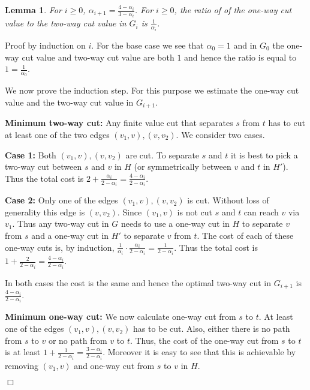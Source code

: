 \documentclass[11pt]{article}
\newtheorem{lemma}{Lemma}[section]
\renewenvironment{proof}{\vspace{-0.1in}\noindent{\bf Proof:}}{\hspace*{\fill}$\Box$\par}
\begin{document}
\begin{lemma}
  For $i \ge 0$, $\alpha_{i+1} = \frac{4 - \alpha_i}{3 - \alpha_i}$. 
  For $i \ge 0$, the ratio of of
  the one-way cut value to the two-way cut value in $G_{i}$ is
  $\frac{1}{\alpha_{i}}$.
\end{lemma}
\begin{proof}
  Proof by induction on $i$. For the base case we see that $\alpha_0 =
  1$ and in $G_0$ the one-way cut value and two-way cut value are both
  $1$ and hence the ratio is equal to $1 = \frac{1}{\alpha_0}$.
  
  We now prove the induction step. For this purpose we estimate the
  one-way cut value and the two-way cut value in $G_{i+1}$.

  \noindent
  \textbf{Minimum two-way cut:} Any finite value cut that separates
  $s$ from $t$ has to cut at least one of the two edges $(v_1,v), (v,v_2)$.
  We consider two cases.
  
  \noindent\textbf{Case 1:} Both $(v_1,v), (v,v_2)$ are cut. 
  To separate $s$ and $t$ it is best to pick a two-way cut between $s$
  and $v$ in $H$ (or symmetrically between $v$ and $t$ in $H'$).
  Thus the total cost is $2 + \frac{\alpha_i}{2-\alpha_i} = \frac{4 -
    \alpha_i}{2-\alpha_i}$.
  
  \noindent\textbf{Case 2:} Only one of the edges  $(v_1,v), (v,v_2)$ is cut.
  Without loss of generality this edge is $(v,v_2)$. Since $(v_1,v)$
  is not cut $s$ and $t$ can reach $v$ via $v_1$. Thus any two-way cut
  in $G$ needs to use a one-way cut in $H$ to separate $v$ from $s$
  and a one-way cut in $H'$ to separate $v$ from $t$. The cost of each
  of these one-way cuts is, by induction, $\frac{1}{\alpha_i} \cdot
  \frac{\alpha_i}{2-\alpha_i} = \frac{1}{2-\alpha_i}$. Thus the total
  cost is $1 + \frac{2}{2-\alpha_i} = \frac{4 -
    \alpha_i}{2-\alpha_i}$.

  In both cases the cost is the same and hence the optimal two-way cut in
  $G_{i+1}$ is $\frac{4 - \alpha_i}{2-\alpha_i}$.
  
 
  \noindent\textbf{Minimum one-way cut:} We now calculate one-way cut
  from $s$ to $t$. At least one of the edges $(v_1,v), (v,v_2)$ has to
  be cut. Also, either there is no path from $s$ to $v$ or no path from $v$ to
  $t$. Thus, the cost of the one-way cut from $s$ to $t$ is at least $1
  + \frac{1}{2-\alpha_i} = \frac{3-\alpha_i}{2-\alpha_i}$. Moreover it
  is easy to see that this is achievable by removing $(v_1,v)$ and
  one-way cut from $s$ to $v$ in $H$.


\end{proof}
\end{document}

